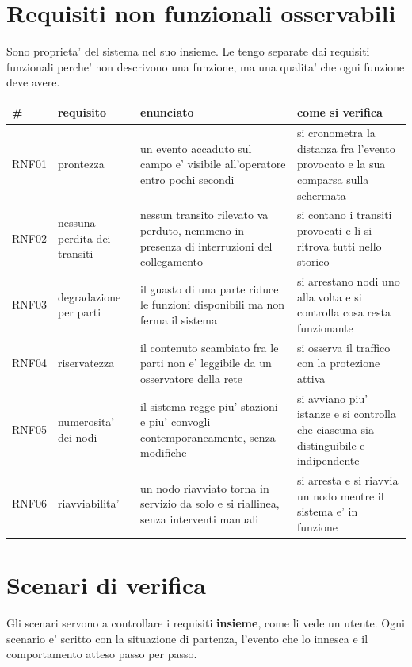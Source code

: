 \documentclass[11pt]{article}
\begin{document}
\section{Requisiti non funzionali osservabili}
\label{sec:org7e4b4e6}

Sono proprieta' del sistema nel suo insieme. Le tengo separate dai requisiti funzionali perche' non
descrivono una funzione, ma una qualita' che ogni funzione deve avere.

\begin{center}
\begin{tabular}{|p{}|p{}|p{}|p{}|}
\# & requisito & enunciato & come si verifica\\
\hline
RNF01 & prontezza & un evento accaduto sul campo e' visibile all'operatore entro pochi secondi & si cronometra la distanza fra l'evento provocato e la sua comparsa sulla schermata\\
RNF02 & nessuna perdita dei transiti & nessun transito rilevato va perduto, nemmeno in presenza di interruzioni del collegamento & si contano i transiti provocati e li si ritrova tutti nello storico\\
RNF03 & degradazione per parti & il guasto di una parte riduce le funzioni disponibili ma non ferma il sistema & si arrestano nodi uno alla volta e si controlla cosa resta funzionante\\
RNF04 & riservatezza & il contenuto scambiato fra le parti non e' leggibile da un osservatore della rete & si osserva il traffico con la protezione attiva\\
RNF05 & numerosita' dei nodi & il sistema regge piu' stazioni e piu' convogli contemporaneamente, senza modifiche & si avviano piu' istanze e si controlla che ciascuna sia distinguibile e indipendente\\
RNF06 & riavviabilita' & un nodo riavviato torna in servizio da solo e si riallinea, senza interventi manuali & si arresta e si riavvia un nodo mentre il sistema e' in funzione\\
\end{tabular}
\end{center}
\section{Scenari di verifica}
\label{sec:orgca7e905}

Gli scenari servono a controllare i requisiti \textbf{insieme}, come li vede un utente. Ogni scenario e'
scritto con la situazione di partenza, l'evento che lo innesca e il comportamento atteso passo per
passo.
\end{document}
